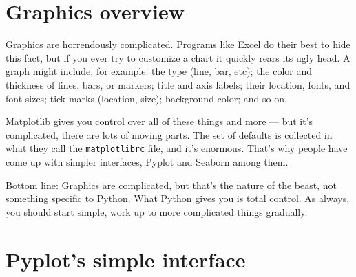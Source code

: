 \documentclass[11pt]{article}
\begin{document}
\section{Graphics overview}

Graphics are horrendously complicated.  Programs like Excel
do their best to hide this fact, but if you ever try to customize
a chart it quickly rears its ugly head.
A graph might include, for example:  the type (line, bar, etc);
the color and thickness of lines, bars, or markers;
title and axis labels;
their location, fonts, and font sizes;
tick marks (location, size);
background color;
and so on.

Matplotlib gives you control over all of these things and more ---
but it's complicated, there are lots of moving parts.
The set of defaults is collected in what they call the
{\tt matplotlibrc} file, and
\href{http://matplotlib.org/1.4.0/users/customizing.html}{it's enormous}.
That's why people have come up with simpler interfaces,
Pyplot and Seaborn among them.

Bottom line:  Graphics are complicated, but that's the nature of the beast,
not something specific to Python.
What Python gives you is total control.
As always, you should start simple, work up to more complicated things gradually.


\section{Pyplot's simple interface}
\end{document}
